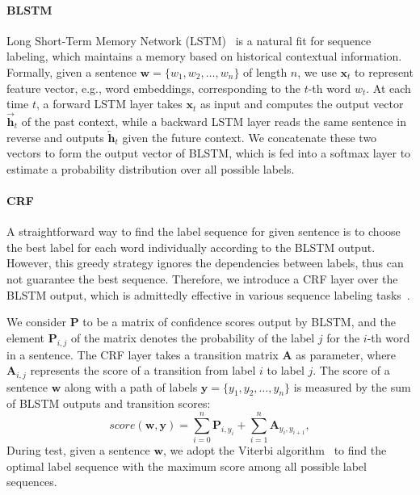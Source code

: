 \paragraph{BLSTM}
Long Short-Term Memory Network (LSTM)~\cite{hochreiter1997long} is a natural fit for sequence labeling, which maintains a memory based on historical contextual information. Formally, given a sentence $\bm{w} = \{w_1, w_2, \dots, w_n\}$ of length $n$, we use $\textbf{x}_t$ to represent feature vector, e.g., word embeddings, corresponding to the $t$-th word $w_t$. 
At each time $t$, a forward LSTM layer takes $\textbf{x}_t$ as input and computes the output vector $\overrightarrow{\textbf{h}}_t$ of the past context, while a backward LSTM layer reads the same sentence in reverse and outputs $\overleftarrow{\textbf{h}}_t$ given the future context. We concatenate these two vectors to form the output vector of BLSTM, which is fed into a softmax layer to estimate a probability distribution over all possible labels.

\paragraph{CRF}
A straightforward way to find the label sequence for given sentence is to choose the 
best label for each word individually according to the BLSTM output.  
However, this greedy strategy ignores the dependencies between labels, thus can not guarantee the best sequence.  %
Therefore, we introduce a CRF layer over the BLSTM output, which is admittedly effective in various sequence labeling tasks~\cite{collobert2011natural,huang2015bidirectional}. %

We consider $\textbf{P}$ to be a matrix of confidence scores output by BLSTM, and the element $\textbf{P}_{i,j}$ of the matrix denotes the probability of the label $j$ for the $i$-th word in a sentence. The CRF layer takes a transition matrix $\textbf{A}$ as parameter, where $\textbf{A}_{i,j}$ represents the score of a transition from label $i$ to label $j$. The score of a sentence $\bm{w}$ along with a path of labels $\bm{y} = \{y_1, y_2, \ldots, y_n\}$ is measured by the sum of BLSTM outputs and transition scores: 
\begin{equation}
	score(\bm{w}, \bm{y}) = \sum\limits_{i=0}^n\textbf{P}_{i, y_i} + \sum\limits_{i=1}^n\textbf{A}_{y_i, y_{i+1}},
\end{equation}
During test, given a sentence $\bm{w}$, we adopt the Viterbi algorithm~\cite{rabiner1989tutorial} to find the optimal label sequence with the maximum score among all possible label sequences.

